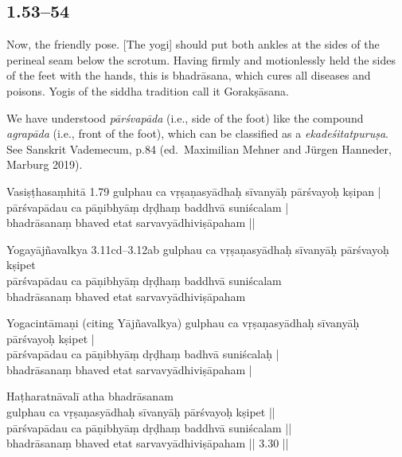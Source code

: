 \begin{ekdosis}
\subsection*{1.53--54}
\begin{translation}[hp01_053]
Now, the friendly pose.
[The yogi] should put both ankles at the sides of the perineal seam below the scrotum.  Having firmly and motionlessly held the sides of the feet with the hands, this is bhadrāsana, which cures all diseases and poisons. Yogis of the siddha tradition call it Gorakṣāsana.
\end{translation}

\begin{philcomm}[hp01_054]
We have understood \emph{pārśvapāda} (i.e., side of the foot) like the compound \emph{agrapāda} (i.e., front of the foot), which can be classified as a \emph{ekadeśitatpuruṣa}. See Sanskrit Vademecum, p.84 (ed.\ Maximilian Mehner and Jürgen Hanneder, Marburg 2019).
\end{philcomm}

\begin{sources}[hp01_053]
Vasiṣṭhasaṃhitā 1.79
\startverse
gulphau ca vṛṣaṇasyādhaḥ sīvanyāḥ pārśvayoḥ kṣipan | \\
pārśvapādau ca pāṇibhyāṃ dṛḍhaṃ baddhvā suniścalam |\\
bhadrāsanaṃ bhaved etat sarvavyādhiviṣāpaham ||
\endverse

Yogayājñavalkya 3.11cd--3.12ab
\startverse
gulphau ca vṛṣaṇasyādhaḥ sīvanyāḥ pārśvayoḥ kṣipet\\
pārśvapādau ca pāṇibhyāṃ dṛḍhaṃ baddhvā suniścalam\\
bhadrāsanaṃ bhaved etat sarvavyādhiviṣāpaham
\endverse
\end{sources}

\begin{testimonia}[hp01_053]
Yogacintāmaṇi (citing Yājñavalkya)
\startverse
gulphau ca vṛṣaṇasyādhaḥ sīvanyāḥ pārśvayoḥ kṣipet |\\
pārśvapādau ca pāṇibhyāṃ dṛḍhaṃ badhvā suniścalaḥ |\\
bhadrāsanaṃ bhaved etat sarvavyādhiviṣāpaham |
\endverse

Haṭharatnāvalī
\startverse
atha bhadrāsanam\\
gulphau ca vṛṣaṇasyādhaḥ sīvanyāḥ pārśvayoḥ kṣipet ||\\
pārśvapādau ca pāṇibhyāṃ dṛḍhaṃ baddhvā suniścalam ||\\
bhadrāsanaṃ bhaved etat sarvavyādhiviṣāpaham || 3.30 ||
\endverse


\end{testimonia}
\end{ekdosis}
